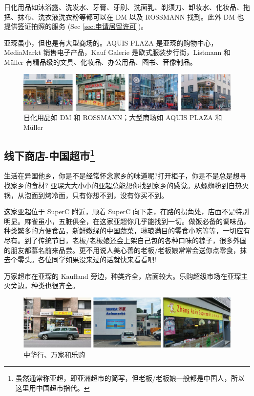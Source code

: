     日化用品如沐浴露、洗发水、牙膏、牙刷、洗面乳、剃须刀、卸妆水、化妆品、拖把、抹布、洗衣液洗衣粉等都可以在 DM 以及 ROSSMANN 找到。此外 DM 也提供签证拍照的服务 (Sec \ref{sec:申请居留许可})。

    亚琛虽小，但也是有大型商场的。AQUIS PLAZA 是亚琛的购物中心，MediaMarkt 销售电子产品，Kauf Galerie 是欧式服装步行街，Listmann 和 Müller 有精品级的文具、化妆品、办公用品、图书、音像制品。

    \begin{figure}[ht]
      \centering
      \includegraphics[width=\textwidth]{在亚琛学习和生活/日常消费和饮食/德国超市/日化用品如 DM 和 ROSSMANN；大型商场如 AQUIS PLAZA 和 Müller.png}
      \caption{日化用品如 DM 和 ROSSMANN；大型商场如 AQUIS PLAZA 和 Müller}
      \label{fig:日化用品如 DM 和 ROSSMANN；大型商场如 AQUIS PLAZA 和 Müller}
    \end{figure}

  \subsection[线下商店-中国超市]{线下商店-中国超市\footnote{虽然通常称亚超，即亚洲超市的简写，但老板/老板娘一般都是中国人，所以这里用中国超市指代。}}\label{subsec:线下商店-中国超市}

    生活在异国他乡，你是不是经常怀念家乡的味道呢?打开柜子，你是不是总是想寻找家乡的食材? 亚琛大大小小的亚超总能帮你找到家乡的感觉。从螺蛳粉到自热火锅，从泡面到烤冷面，只有你想不到，没有你买不到。

    \href{http://www.sinostore.de/}{} 这家亚超位于 SuperC 附近，顺着 SuperC 向下走，在路的拐角处，店面不是特别明显。麻雀虽小，五脏俱全，在这家亚超你几乎能找到一切。做饭必备的调味品，种类繁多的方便食品，新鲜嫩绿的中国蔬菜，琳琅满目的零食小吃等等，一切应有尽有。到了传统节日，老板/老板娘还会上架自己包的各种口味的粽子，很多外国的朋友都慕名前来品尝。更不用说人美心善的老板/老板娘常常会送你点零食，抹去个零头。各位同学如果没来过的话就快来看看吧!

    万家超市在亚琛的 Kaufland 旁边，种类齐全，店面较大。乐购超级市场在亚琛主火旁边，种类也很齐全。

    \begin{figure}[ht]
      \centering
      \includegraphics[width=.9\textwidth]{在亚琛学习和生活/日常消费和饮食/中华行、万家和乐购.png}
      \caption{中华行、万家和乐购}
      \label{fig:中华行、万家和乐购}
    \end{figure}

